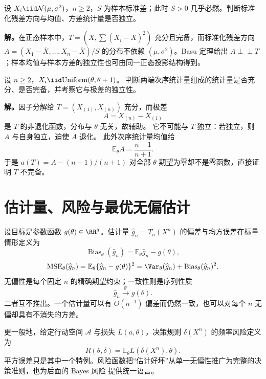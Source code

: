 \begin{workedexample}[标准化正态残差的独立性]
设 $X_i\iid\mathcal N(\mu,\sigma^2)$，$n\ge2$，$S$ 为样本标准差；此时 $S>0$ 几乎必然。判断标准化残差方向与均值、方差统计量是否独立。

\textbf{解。}在正态样本中，$T=(\bar X,\sum(X_i-\bar X)^2)$ 充分且完备，而标准化残差方向 $A=(X_1-\bar X,\ldots,X_n-\bar X)/S$ 的分布不依赖 $(\mu,\sigma^2)$。Basu 定理给出 $A\perp\!\!\!\perp T$；样本均值与样本方差的独立性也可由同一正态投影结构得到。
\end{workedexample}


\begin{workedexample}[充分性不能代替完备性]
设 $n\ge2$，$X_i\iid\mathrm{Uniform}(\theta,\theta+1)$。
判断两端次序统计量组成的统计量是否充分、是否完备，并考察它与极差的独立性。

\textbf{解。}因子分解给 $T=(X_{(1)},X_{(n)})$ 充分，而极差
\[
 A=X_{(n)}-X_{(1)}
\]
是 $T$ 的非退化函数，分布与 $\theta$ 无关，故辅助。
它不可能与 $T$ 独立：若独立，则 $A$ 与自身独立，迫使 $A$ 退化。
此外次序统计量均值给
\[
 \mathbb E_\theta A=\frac{n-1}{n+1}.
\]
于是 $a(T)=A-(n-1)/(n+1)$ 对全部 $\theta$ 期望为零却不是零函数，直接证明 $T$ 不完备。
\end{workedexample}

\section{估计量、风险与最优无偏估计}

\begin{definition}
设目标是参数函数 $g(\theta)\in\RR^q$。估计量 $\widehat g_n=T_n(X^n)$ 的偏差与均方误差在标量情形定义为
\[
 \operatorname{Bias}_\theta(\widehat g_n)
 =\mathbb E_\theta\widehat g_n-g(\theta),
\]
\[
 \operatorname{MSE}_\theta(\widehat g_n)
 =\mathbb E_\theta\{\widehat g_n-g(\theta)\}^2
 =\Var_\theta(\widehat g_n)+\operatorname{Bias}_\theta(\widehat g_n)^2.
\]
无偏性是每个固定 $n$ 的精确期望约束；一致性则是序列性质
\[
 \widehat g_n\xrightarrow{\mathbb P} g(\theta).
\]
二者互不推出。一个估计量可以有 $O(n^{-1})$ 偏差而仍然一致，也可以对每个 $n$ 无偏却具有不消失的方差。
\end{definition}

\begin{definition}[损失与频率风险]
更一般地，给定行动空间 $\mathcal A$ 与损失 $L(a,\theta)$，决策规则 $\delta(X^n)$ 的频率风险定义为
\[
 R(\theta,\delta)
 =\mathbb E_\theta L(\delta(X^n),\theta).
\]
平方误差只是其中一个特例。风险函数把“估计好坏”从单一无偏性推广为完整的决策准则，也为后面的 Bayes 风险 提供统一语言。
\end{definition}

